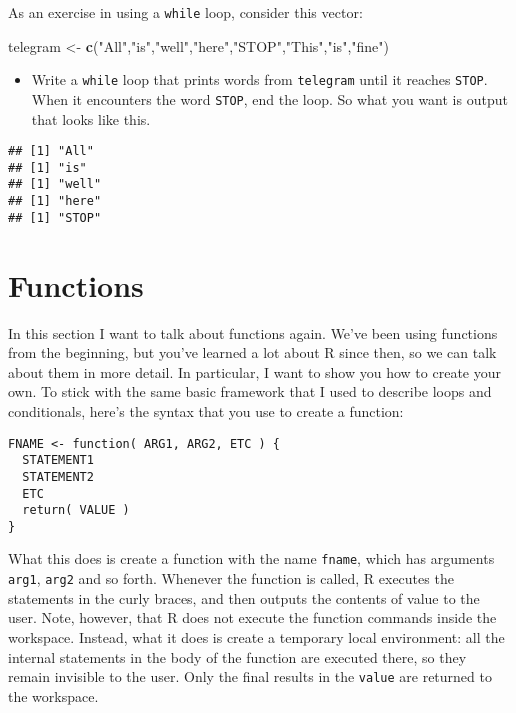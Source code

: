 \documentclass[]{book}
\newenvironment{Shaded}{\begin{snugshade}}{\end{snugshade}}
\newcommand{\KeywordTok}[1]{\textcolor[rgb]{0.13,0.29,0.53}{\textbf{#1}}}
\newcommand{\NormalTok}[1]{#1}
\newcommand{\StringTok}[1]{\textcolor[rgb]{0.31,0.60,0.02}{#1}}
\providecommand{\tightlist}{%
  \setlength{\itemsep}{0pt}\setlength{\parskip}{0pt}}
\begin{document}
As an exercise in using a \texttt{while} loop, consider this vector:

\begin{Shaded}
\begin{Highlighting}[]
\NormalTok{telegram <-}\StringTok{ }\KeywordTok{c}\NormalTok{(}\StringTok{"All"}\NormalTok{,}\StringTok{"is"}\NormalTok{,}\StringTok{"well"}\NormalTok{,}\StringTok{"here"}\NormalTok{,}\StringTok{"STOP"}\NormalTok{,}\StringTok{"This"}\NormalTok{,}\StringTok{"is"}\NormalTok{,}\StringTok{"fine"}\NormalTok{)}
\end{Highlighting}
\end{Shaded}

\begin{itemize}
\tightlist
\item
  Write a \texttt{while} loop that prints words from \texttt{telegram} until it reaches \texttt{STOP}. When it encounters the word \texttt{STOP}, end the loop. So what you want is output that looks like this.
\end{itemize}

\begin{verbatim}
## [1] "All"
## [1] "is"
## [1] "well"
## [1] "here"
## [1] "STOP"
\end{verbatim}

\hypertarget{functions-1}{%
\section{Functions}\label{functions-1}}

In this section I want to talk about functions again. We've been using functions from the beginning, but you've learned a lot about R since then, so we can talk about them in more detail. In particular, I want to show you how to create your own. To stick with the same basic framework that I used to describe loops and conditionals, here's the syntax that you use to create a function:

\begin{verbatim}
FNAME <- function( ARG1, ARG2, ETC ) {
  STATEMENT1
  STATEMENT2
  ETC
  return( VALUE )
}
\end{verbatim}

What this does is create a function with the name \texttt{fname}, which has arguments \texttt{arg1}, \texttt{arg2} and so forth. Whenever the function is called, R executes the statements in the curly braces, and then outputs the contents of value to the user. Note, however, that R does not execute the function commands inside the workspace. Instead, what it does is create a temporary local environment: all the internal statements in the body of the function are executed there, so they remain invisible to the user. Only the final results in the \texttt{value} are returned to the workspace.
\end{document}
